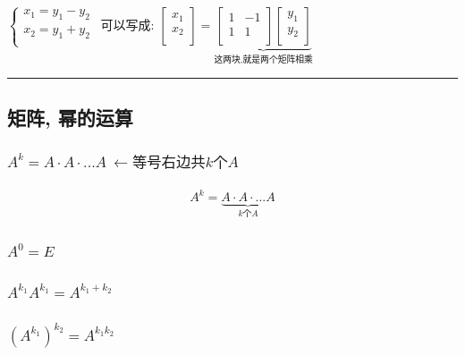 \documentclass[UTF8]{ctexart}
\begin{document}
\begin{myEnvSample}
$
\left\{ \begin{array}{l}
	x_1=y_1-y_2\\
	x_2=y_1+y_2\\
\end{array} \right. \ \ \text{可以写成:\ }\left[ \begin{array}{c}
	x_1\\
	x_2\\
\end{array} \right] =\underset{\text{这两块,就是两个矩阵相乘}}{\underbrace{\left[ \begin{matrix}
			1&		-1\\
			\hline
			1&		1\\
		\end{matrix} \right] \left[ \begin{array}{c}
			y_1\\
			y_2\\
		\end{array} \right] }}
$
\end{myEnvSample}


\hrule

\subsection{矩阵, 幂的运算}
\subsubsection{$A^k=A\cdot A\cdot ...A\ ←\text{等号右边共}k\text{个}A$}

\begin{align*}
	A^k=\underset{k\text{个}A}{\underbrace{A\cdot A\cdot ...A}}
\end{align*}

\subsubsection{$A^0 = E$}

\subsubsection{$A^{k_1}A^{k_1}=A^{k_1+k_2}$}

\subsubsection{$\left( A^{k_1} \right) ^{k_2}=A^{k_1k_2}$}
\end{document}
